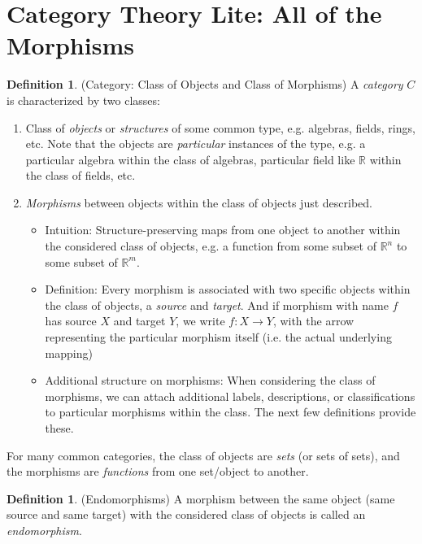 \documentclass[12pt]{book}
\numberwithin{equation}{section} %
\theoremstyle{plain}
\theoremstyle{definition}
\newtheorem{defn}[thm]{Definition}
\theoremstyle{remark}
\newcommand{\ra}{\rightarrow}
\newcommand{\R}{\mathbb{R}}
\begin{document}
\clearpage
\section{Category Theory Lite: All of the Morphisms}

\begin{defn}(Category: Class of Objects and Class of Morphisms)
A \emph{category} $C$ is characterized by two classes:
\begin{enumerate}[label=(\roman*)]
  \item Class of \emph{objects} or \emph{structures} of some common
    type, e.g. algebras, fields, rings, etc.
    Note that the objects are \emph{particular} instances of the type,
    e.g. a particular algebra within the class of algebras, particular
    field like $\R$ within the class of fields, etc.
  \item \emph{Morphisms} between objects within the class of objects
    just described.
    \begin{itemize}
      \item Intuition:
        Structure-preserving maps from one object to another within the
        considered class of objects, e.g. a function from some subset of
        $\R^n$ to some subset of $\R^m$.

      \item Definition:
        Every morphism is associated with two specific objects within
        the class of objects, a \emph{source} and \emph{target}.
        And if morphism with name $f$ has source $X$ and target $Y$, we
        write $f:X\ra Y$, with the arrow representing the particular
        morphism itself (i.e. the actual underlying mapping)

      \item Additional structure on morphisms:
        When considering the class of morphisms, we can attach
        additional labels, descriptions, or classifications to
        particular morphisms within the class.
        The next few definitions provide these.
    \end{itemize}
\end{enumerate}
For many common categories, the class of objects are \emph{sets} (or
sets of sets), and the morphisms are \emph{functions} from one
set/object to another.
\end{defn}


\begin{defn}(Endomorphisms)
A morphism between the same object (same source and same target) with
the considered class of objects is called an \emph{endomorphism}.
\end{defn}
\end{document}
